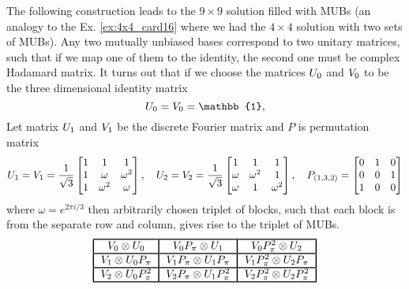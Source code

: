 \documentclass[11pt]{article}
\begin{document}
\begin{example}
The following construction leads to the $9\times 9$ solution filled with MUBs (an analogy to the Ex. \ref{ex:4x4_card16} where we had the $4\times 4$ solution with two sets of MUBs).
\newline
Any two mutually unbiased bases correspond to two unitary matrices, such that if we map one of them to the identity, the second one must be complex Hadamard matrix. It turns out that if we choose the matrices $\mathnormal{U}_0$ and $\mathnormal{V}_0$ to be the three dimensional identity matrix
\[
\mathnormal{U}_0=\mathnormal{V}_0=\mathbb{1},
\]
Let matrix $\mathnormal{U}_1$ and $\mathnormal{V}_1$ be the discrete Fourier matrix and $P$ is permutation matrix
\[
\mathnormal{U}_1=\mathnormal{V}_1=
\frac{1}{\sqrt{3}}
\begin{bmatrix}
    1 & 1 & 1 \\
    1 & \omega & \omega^2 \\
    1 & \omega^2 & \omega
\end{bmatrix},
    \quad    
    \mathnormal{U}_2=\mathnormal{V}_2=
\frac{1}{\sqrt{3}}
\begin{bmatrix}
    1 & 1 & 1 \\
    \omega & \omega^2 & 1 \\
    \omega & 1 & \omega^2
\end{bmatrix}, 
    \quad
P_{(1,3,2)} = 
\begin{bmatrix}
    0 & 1 & 0 \\
    0 & 0 & 1 \\
    1 & 0 & 0
\end{bmatrix}
\]
where $\omega=e^{2\pi i/3}$ then arbitrarily chosen triplet of blocks, such that each block is from the separate row and column, gives rise to the triplet of MUBs.
\[
\begin{tabular}{!{\vrule width 1pt}c!{\vrule width 1pt}c!{\vrule width 1pt}c!{\vrule width 1pt}c!{\vrule width 1pt}c!{\vrule width 1pt}}
    \noalign{\hrule height 1pt}
    $\mathnormal{V}_0\otimes\mathnormal{U}_0$ & $\mathnormal{V}_0\mathnormal{P}_\pi\otimes\mathnormal{U}_1$ & $\mathnormal{V}_0\mathnormal{P}_\pi^2\otimes\mathnormal{U}_2$ \tabularnewline
    \noalign{\hrule height 1pt}
    $\mathnormal{V}_1\otimes\mathnormal{U}_0\mathnormal{P}_\pi$ & $\mathnormal{V}_1\mathnormal{P}_\pi\otimes\mathnormal{U}_1\mathnormal{P}_\pi$ & $\mathnormal{V}_1\mathnormal{P}_\pi^2\otimes\mathnormal{U}_2\mathnormal{P}_\pi$ \tabularnewline
    \noalign{\hrule height 1pt}
    $\mathnormal{V}_2\otimes\mathnormal{U}_0\mathnormal{P}_\pi^2$ & $\mathnormal{V}_2\mathnormal{P}_\pi\otimes\mathnormal{U}_1\mathnormal{P}_\pi^2$ & $\mathnormal{V}_2\mathnormal{P}_\pi^2\otimes\mathnormal{U}_2\mathnormal{P}_\pi^2$ \tabularnewline
    \noalign{\hrule height 1pt}
    \end{tabular}
\]

\end{example}

\printbibliography
\end{document}
